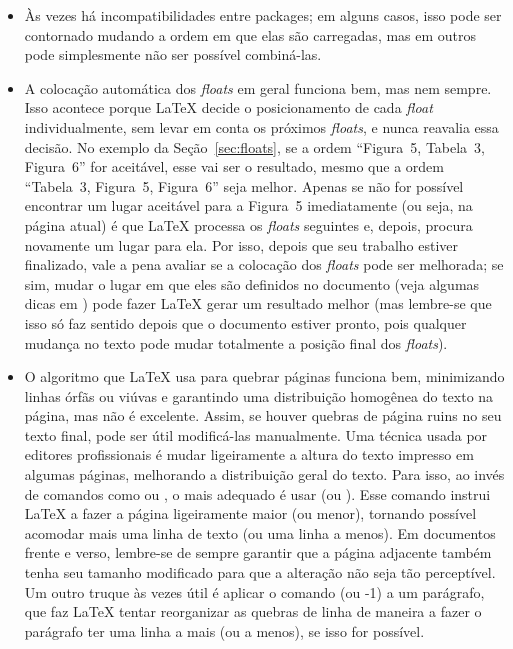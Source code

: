 \begin{itemize}
    \item Às vezes há incompatibilidades entre packages; em alguns casos,
    isso pode ser contornado mudando a ordem em que elas são carregadas,
    mas em outros pode simplesmente não ser possível combiná-las.

    \item A colocação automática dos \emph{floats} em geral funciona bem, mas
    nem sempre. Isso acontece porque \LaTeX{} decide o posicionamento de cada
    \emph{float} individualmente, sem levar em conta os próximos \emph{floats},
    e nunca reavalia essa decisão. No exemplo da Seção~\ref{sec:floats}, se a
    ordem ``Figura~5, Tabela~3, Figura~6'' for aceitável, esse vai ser o
    resultado, mesmo que a ordem ``Tabela~3, Figura~5, Figura~6'' seja melhor.
    Apenas se não for possível encontrar um lugar aceitável para a Figura~5
    imediatamente (ou seja, na página atual) é que \LaTeX{} processa os
    \emph{floats} seguintes e, depois, procura novamente um lugar para ela.
    Por isso, depois que seu trabalho estiver finalizado, vale a pena
    avaliar se a colocação dos \emph{floats} pode ser melhorada; se sim,
    mudar o lugar em que eles são definidos no documento (veja algumas
    dicas em \cite{floats2014}) pode fazer \LaTeX{}
    gerar um resultado melhor (mas lembre-se que isso só faz sentido depois
    que o documento estiver pronto, pois qualquer mudança no texto pode
    mudar totalmente a posição final dos \emph{floats}).

    \item O algoritmo que \LaTeX{} usa para quebrar páginas funciona
    bem, minimizando linhas órfãs ou viúvas e garantindo uma distribuição
    homogênea do texto na página, mas não é excelente. Assim, se
    houver quebras de página ruins no seu texto final, pode ser útil
    modificá-las manualmente. Uma técnica usada por editores profissionais
    é mudar ligeiramente a altura do texto impresso em algumas páginas,
    melhorando a distribuição geral do texto. Para isso, ao invés
    de comandos como  ou , o mais
    adequado é usar  (ou
    ). Esse comando instrui \LaTeX{} a fazer
    a página ligeiramente maior (ou menor), tornando possível acomodar
    mais uma linha de texto (ou uma linha a menos). Em documentos frente
    e verso, lembre-se de sempre garantir que a página adjacente também
    tenha seu tamanho modificado para que a alteração não seja tão
    perceptível. Um outro truque às vezes útil é aplicar o comando
     (ou -1) a um parágrafo, que faz \LaTeX{} tentar
    reorganizar as quebras de linha de maneira a fazer o parágrafo ter
    uma linha a mais (ou a menos), se isso for possível.


\end{itemize}
